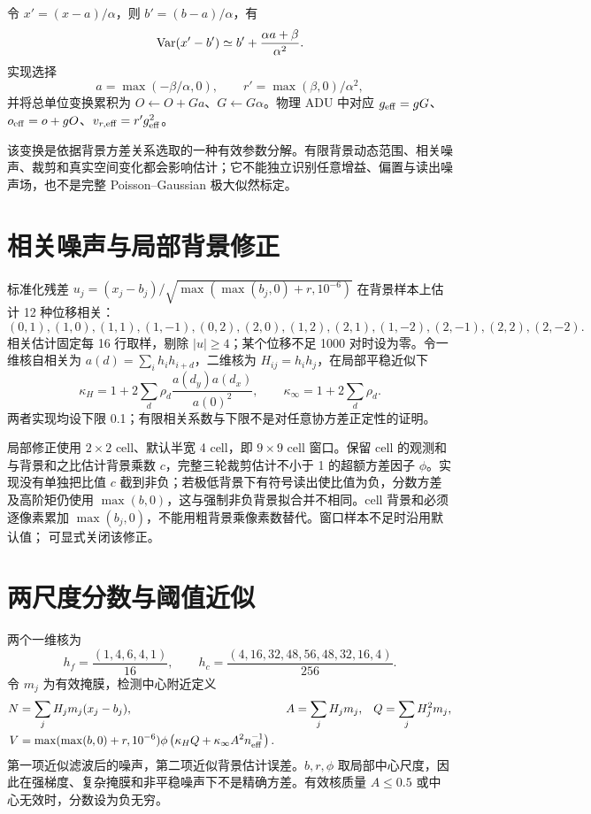 令 $x'=(x-a)/\alpha$，则 $b'=(b-a)/\alpha$，有
\begin{equation}
\operatorname{Var}(x'-b')\simeq b'+\frac{\alpha a+\beta}{\alpha^2}.
\end{equation}
实现选择
\begin{equation}
a=\max(-\beta/\alpha,0),\qquad
r'=\max(\beta,0)/\alpha^2,
\end{equation}
并将总单位变换累积为 $O\leftarrow O+Ga$、$G\leftarrow G\alpha$。物理 ADU 中对应 $g_{\rm eff}=gG$、$o_{\rm eff}=o+gO$、$v_{r,\rm eff}=r'g_{\rm eff}^2$。

该变换是依据背景方差关系选取的一种有效参数分解。有限背景动态范围、相关噪声、裁剪和真实空间变化都会影响估计；它不能独立识别任意增益、偏置与读出噪声场，也不是完整 Poisson--Gaussian 极大似然标定。
\section{相关噪声与局部背景修正}
标准化残差 $u_j=(x_j-b_j)/\sqrt{\max(\max(b_j,0)+r,10^{-6})}$ 在背景样本上估计 12 种位移相关：
\begin{equation}
(0,1),(1,0),(1,1),(1,-1),(0,2),(2,0),
(1,2),(2,1),(1,-2),(2,-1),(2,2),(2,-2).
\end{equation}
相关估计固定每 16 行取样，剔除 $|u|\ge4$；某个位移不足 1000 对时设为零。令一维核自相关为 $a(d)=\sum_i h_i h_{i+d}$，二维核为 $H_{ij}=h_i h_j$，在局部平稳近似下
\begin{equation}
\kappa_H=1+2\sum_d\rho_d\frac{a(d_y)a(d_x)}{a(0)^2},\qquad
\kappa_\infty=1+2\sum_d\rho_d.
\end{equation}
两者实现均设下限 0.1；有限相关系数与下限不是对任意协方差正定性的证明。

局部修正使用 $2\times2$ cell、默认半宽 4 cell，即 $9\times9$ cell 窗口。保留 cell 的观测和与背景和之比估计背景乘数 $c$，完整三轮裁剪估计不小于 1 的超额方差因子 $\phi$。实现没有单独把比值 $c$ 截到非负；若极低背景下有符号读出使比值为负，分数方差及高阶矩仍使用 $\max(b,0)$，这与强制非负背景拟合并不相同。cell 背景和必须逐像素累加 $\max(b_j,0)$，不能用粗背景乘像素数替代。窗口样本不足时沿用默认值； 可显式关闭该修正。
\section{两尺度分数与阈值近似}
两个一维核为
\begin{equation}
h_f=\frac{(1,4,6,4,1)}{16},\qquad
h_c=\frac{(4,16,32,48,56,48,32,16,4)}{256}.
\end{equation}
令 $m_j$ 为有效掩膜，检测中心附近定义
\begin{align}
N&=\sum_j H_jm_j(x_j-b_j),& A&=\sum_jH_jm_j,&Q&=\sum_jH_j^2m_j,\\
V&=\max(\max(b,0)+r,10^{-6})\phi
\left(\kappa_HQ+\kappa_\infty A^2n_{\rm eff}^{-1}\right).
\end{align}
第一项近似滤波后的噪声，第二项近似背景估计误差。$b,r,\phi$ 取局部中心尺度，因此在强梯度、复杂掩膜和非平稳噪声下不是精确方差。有效核质量 $A\le0.5$ 或中心无效时，分数设为负无穷。

